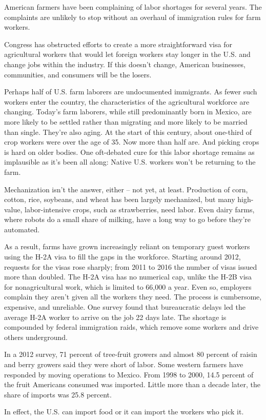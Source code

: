 American farmers have been complaining of labor shortages for several years. The complaints are unlikely to stop without an overhaul of immigration rules for farm workers.


Congress has obstructed efforts to create a more straightforward visa for agricultural workers that would let foreign workers stay longer in the U.S. and change jobs within the industry. If this doesn't change, American businesses, communities, and consumers will be the losers.


Perhaps half of U.S. farm laborers are undocumented immigrants. As fewer such workers enter the country, the characteristics of the agricultural workforce are changing. Today's farm laborers, while still predominantly born in Mexico, are more likely to be settled rather than migrating and more likely to be married than single. They're also aging. At the start of this century, about one-third of crop workers were over the age of 35. Now more than half are. And picking crops is hard on older bodies. One oft-debated cure for this labor shortage remains as implausible as it's been all along: Native U.S. workers won't be returning to the farm.


Mechanization isn't the answer, either – not yet, at least. Production of corn, cotton, rice, soybeans, and wheat has been largely mechanized, but many high-value, labor-intensive crops, such as strawberries, need labor. Even dairy farms, where robots do a small share of milking, have a long way to go before they're automated.


As a result, farms have grown increasingly reliant on temporary guest workers using the H-2A visa to fill the gaps in the workforce. Starting around 2012, requests for the visas rose sharply; from 2011 to 2016 the number of visas issued more than doubled. The H-2A visa has no numerical cap, unlike the H-2B visa for nonagricultural work, which is limited to 66,000 a year. Even so, employers complain they aren't given all the workers they need. The process is cumbersome, expensive, and unreliable. One survey found that bureaucratic delays led the average H-2A worker to arrive on the job 22 days late. The shortage is compounded by federal immigration raids, which remove some workers and drive others underground.


In a 2012 survey, 71 percent of tree-fruit growers and almost 80 percent of raisin and berry growers said they were short of labor. Some western farmers have responded by moving operations to Mexico. From 1998 to 2000, 14.5 percent of the fruit Americans consumed was imported. Little more than a decade later, the share of imports was 25.8 percent.


In effect, the U.S. can import food or it can import the workers who pick it.